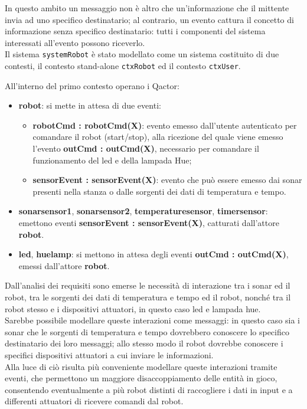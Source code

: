 \documentclass{llncs}
\newcommand{\action}[1]{\texttt{#1}\xspace}
\begin{document}
In questo ambito un messaggio non è altro che un'informazione che il mittente invia ad uno specifico destinatario; al contrario, un evento cattura il concetto di informazione senza specifico destinatario: tutti i componenti del sistema interessati all'evento possono riceverlo. \\

Il sistema \action{systemRobot} è stato modellato come un sistema costituito di due contesti, il contesto stand-alone \action{ctxRobot} ed il contesto \action{ctxUser}. 

All'interno del primo contesto operano i Qactor:
\begin{itemize}
	\item \textbf{robot}: si mette in attesa di due eventi: 
	\begin{itemize}
		\item \textbf{robotCmd : robotCmd(X)}: evento emesso dall'utente autenticato per comandare il robot (start/stop), alla ricezione del quale viene emesso l'evento \textbf{outCmd : outCmd(X)}, necessario per comandare il funzionamento del led e della lampada Hue;
		\item \textbf{sensorEvent : sensorEvent(X)}: evento che può essere emesso dai sonar presenti nella stanza o dalle sorgenti dei dati di temperatura e tempo.
	\end{itemize}
	 \item \textbf{sonarsensor1}, \textbf{sonarsensor2}, \textbf{temperaturesensor}, \textbf{timersensor}: emettono eventi \textbf{sensorEvent : sensorEvent(X)}, catturati dall'attore \textbf{robot}.
	 \item \textbf{led}, \textbf{huelamp}: si mettono in attesa 
	 degli eventi \textbf{outCmd : outCmd(X)}, emessi dall'attore \textbf{robot}. 
\end{itemize}
Dall'analisi dei requisiti sono emerse le necessità di interazione tra i sonar ed il robot, tra le sorgenti dei dati di temperatura e tempo ed il robot, nonché tra il robot stesso e i dispositivi attuatori, in questo caso led e lampada hue. \\
Sarebbe possibile modellare queste interazioni come messaggi: in questo caso sia i sonar che le sorgenti di temperatura e tempo dovrebbero conoscere lo specifico destinatario dei loro messaggi; allo stesso modo il robot dovrebbe conoscere i specifici dispositivi attuatori a cui inviare le informazioni. \\
Alla luce di ciò risulta più conveniente modellare queste interazioni tramite eventi, che permettono un maggiore disaccoppiamento delle entità in gioco, consentendo eventualmente a più robot distinti di raccogliere i dati in input e a differenti attuatori di ricevere comandi dal robot. \\
\end{document}
